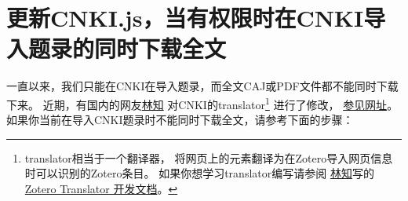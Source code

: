 \documentclass[cn,11pt,chinese]{elegantbook}
\begin{document}
	\section{更新CNKI.js，当有权限时在CNKI导入题录的同时下载全文}\label{sec:cnki_fulltext}
				一直以来，我们只能在CNKI在导入题录，而全文CAJ或PDF文件都不能同时下载下来。
				近期，有国内的网友\href{https://www.zhihu.com/people/lin-zhi-70}{林知}
				对CNKI的translator\footnote{translator相当于一个翻译器，
				将网页上的元素翻译为在Zotero导入网页信息时可以识别的Zotero条目。
				如果你想学习translator编写请参阅
				\href{https://www.zhihu.com/people/lin-zhi-70}{林知}写的
				\href{https://zhuanlan.zhihu.com/p/349871853}{Zotero Translator 开发文档}。}
				进行了修改，
				\href{https://www.linxingzhong.top/posts/2019-11-5/?tdsourcetag=s_pctim_aiomsg}{参见网址}。
				如果你当前在导入CNKI题录时不能同时下载全文，请参考下面的步骤：
\end{document}
